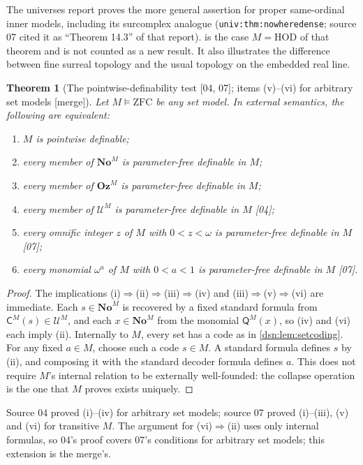\documentclass[11pt,a4paper]{article}
\numberwithin{equation}{section}
\newtheorem{theorem}{Theorem}[section]
\theoremstyle{definition}
\theoremstyle{remark}
\newcommand{\No}{\mathbf{No}}
\newcommand{\Oz}{\mathbf{Oz}}
\newcommand{\HOD}{\mathrm{HOD}}
\newcommand{\ZFC}{\mathrm{ZFC}}
\newcommand{\Code}{\mathsf C}
\newcommand{\Mc}{\mathsf Q}
\newcommand{\Cell}{\mathcal U}
\newcommand{\src}[1]{\textup{\textsf{\small[#1]}}}
\newcommand{\mergetag}{\textup{\textsf{\small[merge]}}}
\newcommand{\lbl}[1]{\nolinkurl{#1}}
\begin{document}
The universes report proves the more general assertion for proper
same-ordinal inner models, including its surcomplex analogue
(\lbl{univ:thm:nowheredense}; source 07 cited it as ``Theorem 14.3'' of
that report).  is the case $M=\HOD$ of that
theorem and is not counted as a new result. It also illustrates the
difference between fine surreal topology and the usual topology on the
embedded real line.

\begin{theorem}[The pointwise-definability test \src{04, 07}; items (v)--(vi) for arbitrary set models \mergetag]\label{dsn:thm:pointwise}
Let $M\models\ZFC$ be any set model. In external semantics, the
following are equivalent:
\begin{enumerate}[label=\textup{(\roman*)}]
\item $M$ is pointwise definable;
\item every member of $\No^M$ is parameter-free definable in $M$;
\item every member of $\Oz^M$ is parameter-free definable in $M$;
\item every member of $\Cell^M$ is parameter-free definable in $M$ \src{04};
\item every omnific integer $z$ of $M$ with $0<z<\omega$ is parameter-free
definable in $M$ \src{07};
\item every monomial $\omega^a$ of $M$ with $0<a<1$ is parameter-free
definable in $M$ \src{07}.
\end{enumerate}
\end{theorem}
\begin{proof}
The implications (i)$\Rightarrow$(ii)$\Rightarrow$(iii)$\Rightarrow$(iv)
and (iii)$\Rightarrow$(v)$\Rightarrow$(vi) are immediate. Each
$s\in\No^M$ is recovered by a fixed standard formula from
$\Code^M(s)\in\Cell^M$, and each $x\in\No^M$ from the monomial
$\Mc^M(x)$, so (iv) and (vi) each imply (ii). Internally to $M$, every set
has a code as in \cref{dsn:lem:setcoding}. For any fixed $a\in M$, choose
such a code $s\in M$. A standard formula defines $s$ by (ii), and composing
it with the standard decoder formula defines $a$. This does not require
$M$'s internal relation to be externally well-founded: the collapse
operation is the one that $M$ proves exists uniquely.
\end{proof}

Source 04 proved (i)--(iv) for arbitrary set models; source 07 proved
(i)--(iii), (v) and (vi) for transitive $M$. The argument for
(vi)$\Rightarrow$(ii) uses only internal formulas, so 04's proof covers
07's conditions for arbitrary set models; this extension is the merge's.
\end{document}
